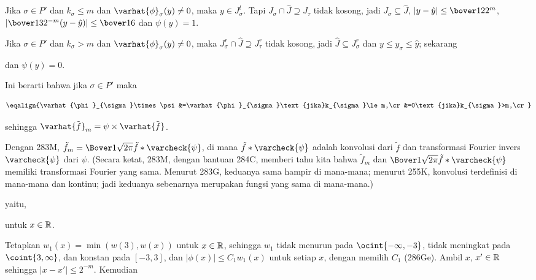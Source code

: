 {\medskip

 Jika $\sigma\in P'$ dan $k_{\sigma}\le m$ dan
$\varhat{\phi}_{\sigma}(y)\ne 0$, maka $y\in J^l_{\sigma}$. Tapi
$J_{\sigma}\cap\hat J\supseteq J_{\tau}$ tidak kosong, jadi
$J_{\sigma}\subseteq\hat J$, $|y-\hat y|\le\bover122^m$,
$|\bover132^{-m}(y-\hat y)|\le\bover16$ dan $\psi(y)=1$.

\medskip

 Jika $\sigma\in P'$ dan $k_{\sigma}>m$ dan
$\varhat{\phi}_{\sigma}(y)\ne 0$, maka $J^r_{\sigma}\cap\hat J\supseteq
J^r_{\tau}$ tidak kosong, jadi $\hat J\subseteq J^r_{\sigma}$ dan $y\le
y_{\sigma}\le\hat y$; sekarang


\noindent dan $\psi(y)=0$. \medskip

 Ini berarti bahwa jika $\sigma\in P'$ maka

$$\eqalign{\varhat{\phi}_{\sigma}\times\psi
&=\varhat{\phi}_{\sigma}\text{jika}k_{\sigma}\le m,\cr
&=0\text{jika}k_{\sigma}>m,\cr}$$

\noindent sehingga $\varhat{\vartildef}_m=\psi\times\varhat{\vartildef}$.

\medskip

 Dengan 283M, $\tilde f_m=\Bover1{\sqrt{2\pi}}\tilde
f*\varcheck{\psi}$, di mana $\tilde f*\varcheck{\psi}$ adalah konvolusi dari
$\tilde f$ dan transformasi Fourier invers $\varcheck{\psi}$ dari $\psi$.
(Secara ketat, 283M, dengan bantuan 284C, memberi tahu kita bahwa $\tilde
f_m$ dan $\Bover1{\sqrt{2\pi}}\tilde f*\varcheck{\psi}$ memiliki transformasi
Fourier yang sama. Menurut 283G, keduanya sama hampir di mana-mana; menurut
255K, konvolusi terdefinisi di mana-mana dan kontinu; jadi keduanya sebenarnya
merupakan fungsi yang sama di mana-mana.)


\noindent yaitu,


\noindent untuk $x\in\Bbb R$.

\medskip

 Tetapkan $w_1(x)=\min(w(3),w(x))$ untuk $x\in\Bbb R$, sehingga
$w_1$ tidak menurun pada $\ocint{-\infty,-3}$, tidak meningkat pada
$\coint{3,\infty}$, dan konstan pada $[-3,3]$, dan $|\phi(x)|\le C_1w_1(x)$
untuk setiap $x$, dengan memilih $C_1$ (286Ge). Ambil $x$, $x'\in\Bbb R$
sehingga $|x-x'|\le 2^{-m}$. Kemudian

}

